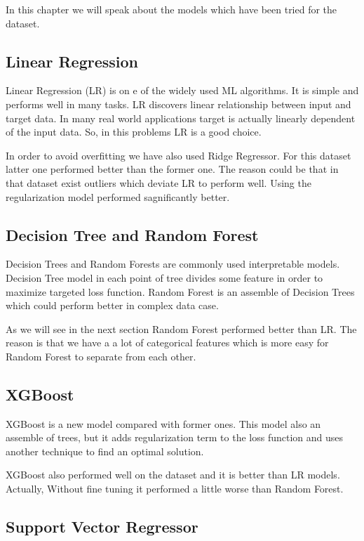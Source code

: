 \documentclass{article}
\begin{document}
In this chapter we will speak about the models which have been tried for the dataset. 

\subsection{Linear Regression}

Linear Regression (LR) is on e of the widely used ML algorithms. It is simple and performs well in many tasks. LR discovers linear relationship between input and target data. In many real world applications target is actually linearly dependent of the input data. So, in this problems LR is a good choice. 

In order to avoid overfitting we have also used Ridge Regressor. For this dataset latter one performed better than the former one. The reason could be that in that dataset exist outliers which deviate LR to perform well. Using the regularization model performed sagnificantly better. 


\subsection{Decision Tree and Random Forest}

Decision Trees and Random Forests are commonly used interpretable models. Decision Tree model in each point of tree divides some feature in order to maximize targeted loss function. Random Forest is an assemble of Decision Trees which could perform better in complex data case. 

As we will see in the next section Random Forest performed better than LR. The reason is that we have a a lot of categorical features which is more easy for Random Forest to separate from each other. 


\subsection{XGBoost}

XGBoost is a new model compared with former ones. This model also an assemble of trees, but it adds regularization term to the loss function and uses another technique to find an optimal solution. 

XGBoost also performed well on the dataset and it is better than LR models. Actually, Without fine tuning it performed a little worse than Random Forest. 

\subsection{Support Vector Regressor}
\end{document}
